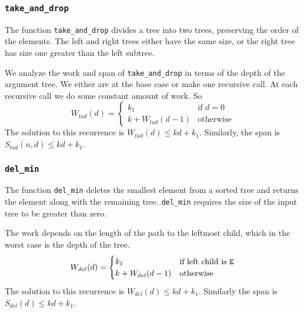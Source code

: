 \documentclass[12pt,letterpaper]{article}
\newcommand{\T}[1]{\texttt{#1}}
\begin{document}
\subsubsection{\T{take\_and\_drop}}
The function \T{take\_and\_drop} divides a tree into two trees, preserving the order of the elements.
The left and right trees either have the same size, or the right tree has size one greater than the left subtree.

We analyze the work and span of \T{take\_and\_drop} in terms of the depth of the argument tree.
We either are at the base case or make one recursive call.
At each recursive call we do some constant amount of work.
So 
\[ W_{tad}(d) =
  \begin{cases}
    k_1 &\text{if }d=0\\
    k + W_{tad}(d-1) &\text{otherwise}
  \end{cases}
\]
The solution to this recurrence is $W_{tad}(d) \leq kd + k_1$.
Similarly, the span is $S_{tad}(n, d) \leq kd + k_1$.

\subsubsection{\T{del\_min}}
The function \T{del\_min} deletes the smallest element from a sorted tree and returns the element along with the remaining tree.
\T{del\_min} requires the size of the input tree to be greater than zero.

The work depends on the length of the path to the leftmost child, which in the worst case is the depth of the tree. 
\[ W_{del}(d) =
  \begin{cases}
    k_1 & \text{if left child is \T{E}}\\
    k + W_{del}(d-1) &\text{otherwise}
  \end{cases}
\]
The solution to this recurrence is $W_{del}(d) \leq kd + k_1$.
Similarly the span is $S_{del}(d) \leq kd + k_1$.
\end{document}
